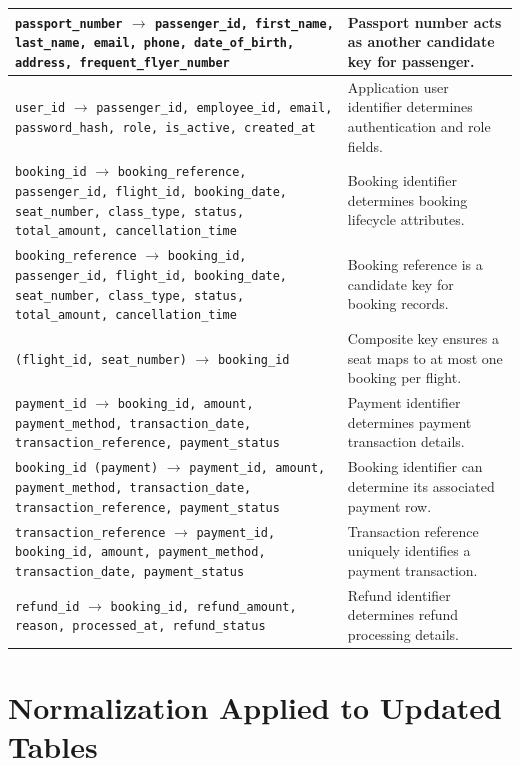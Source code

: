 \documentclass[12pt, a4paper]{article}
\begin{document}
\begin{longtable}{|p{}|p{}|}
\hline
\texttt{passport\_number} $\rightarrow$ \texttt{passenger\_id, first\_name, last\_name, email, phone, date\_of\_birth, address, frequent\_flyer\_number} & Passport number acts as another candidate key for passenger. \\
\hline
\texttt{user\_id} $\rightarrow$ \texttt{passenger\_id, employee\_id, email, password\_hash, role, is\_active, created\_at} & Application user identifier determines authentication and role fields. \\
\hline
\texttt{booking\_id} $\rightarrow$ \texttt{booking\_reference, passenger\_id, flight\_id, booking\_date, seat\_number, class\_type, status, total\_amount, cancellation\_time} & Booking identifier determines booking lifecycle attributes. \\
\hline
\texttt{booking\_reference} $\rightarrow$ \texttt{booking\_id, passenger\_id, flight\_id, booking\_date, seat\_number, class\_type, status, total\_amount, cancellation\_time} & Booking reference is a candidate key for booking records. \\
\hline
\texttt{(flight\_id, seat\_number)} $\rightarrow$ \texttt{booking\_id} & Composite key ensures a seat maps to at most one booking per flight. \\
\hline
\texttt{payment\_id} $\rightarrow$ \texttt{booking\_id, amount, payment\_method, transaction\_date, transaction\_reference, payment\_status} & Payment identifier determines payment transaction details. \\
\hline
\texttt{booking\_id (payment)} $\rightarrow$ \texttt{payment\_id, amount, payment\_method, transaction\_date, transaction\_reference, payment\_status} & Booking identifier can determine its associated payment row. \\
\hline
\texttt{transaction\_reference} $\rightarrow$ \texttt{payment\_id, booking\_id, amount, payment\_method, transaction\_date, payment\_status} & Transaction reference uniquely identifies a payment transaction. \\
\hline
\texttt{refund\_id} $\rightarrow$ \texttt{booking\_id, refund\_amount, reason, processed\_at, refund\_status} & Refund identifier determines refund processing details. \\
\hline
\end{longtable}
\normalsize

\section{Normalization Applied to Updated Tables}
\end{document}
